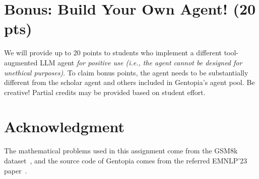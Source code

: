 \documentclass[11pt,addpoints,answers]{exam}
\begin{document}
\bigskip
\section*{Bonus: Build Your Own Agent! (20 pts)}

We will provide up to 20 points to students who implement a different tool-augmented LLM agent \emph{for positive use (i.e., the agent cannot be designed for unethical purposes)}. To claim bonus points, the agent needs to be substantially different from the scholar agent and others included in Gentopia's agent pool. Be creative! Partial credits may be provided based on student effort.


\bigskip
\section*{Acknowledgment}
The mathematical problems used in this assignment come from the GSM8k dataset~\cite{cobbe2021training}, and the source code of Gentopia comes from the referred EMNLP'23 paper~\cite{xu2023gentopia}.




\end{document}
